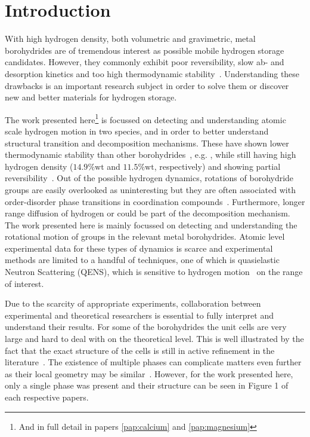 \section{Introduction}
\label{sec:borohydrides-introduction}
With high hydrogen density, both volumetric and gravimetric, metal borohydrides are of tremendous interest as possible mobile hydrogen storage candidates.
However, they commonly exhibit poor reversibility, slow ab- and desorption kinetics and too high thermodynamic stability~\cite{lithium-stability-2003, borohydride-stability-2006, calcium-stability-2006}.
Understanding these drawbacks is an important research subject in order to solve them or discover new and better materials for hydrogen storage.

The work presented here\footnote{And in full detail in papers \ref{pap:calcium} and \ref{pap:magnesium}} is focussed on detecting and understanding atomic scale hydrogen motion in two species,  and  in order to better understand structural transition and decomposition mechanisms.
These have shown lower thermodynamic stability than other borohydrides~\cite{borohydride-stability-2006, calcium-stability-2006}, e.g. , while still having high hydrogen density ($14.9\%\text{wt}$ and $11.5\%\text{wt}$, respectively) and showing partial reversibility~\cite{magnesium-reversibility-severa-2010, magnesium-reversibility-chong-2011, calcium-reversibility-2007, calcium-reversibility-2008, reversibility-destabilisation-2008}.
Out of the possible hydrogen dynamics, rotations of borohydride groups are easily overlooked as uninteresting but they are often associated with order-disorder phase transitions in coordination compounds~\cite{order-disorder-2010, order-disorder-2006}.
Furthermore, longer range diffusion of hydrogen or  could be part of the decomposition mechanism.
The work presented here is mainly focussed on detecting and understanding the rotational motion of  groups in the relevant metal borohydrides.
Atomic level experimental data for these types of dynamics is scarce and experimental methods are limited to a handful of techniques, one of which is quasielastic Neutron Scattering (QENS), which is sensitive to hydrogen motion~\cite{qens-bee-1988} on the range of interest.

Due to the scarcity of appropriate experiments, collaboration between experimental and theoretical researchers is essential to fully interpret and understand their results.
For some of the borohydrides the unit cells are very large and hard to deal with on the theoretical level.
This is well illustrated by the fact that the exact structure of the cells is still in active refinement in the literature~\cite{cabh42-structure-p42m, cabh42-structure-p4}.
The existence of multiple phases can complicate matters even further as their local geometry may be similar~\cite{mgbh42-structure-fddd, mgbh42-phases-2007, mgbh42-phases-2008, mgbh42-phases-2009}.
However, for the work presented here, only a single phase was present and their structure can be seen in Figure 1 of each respective papers.
